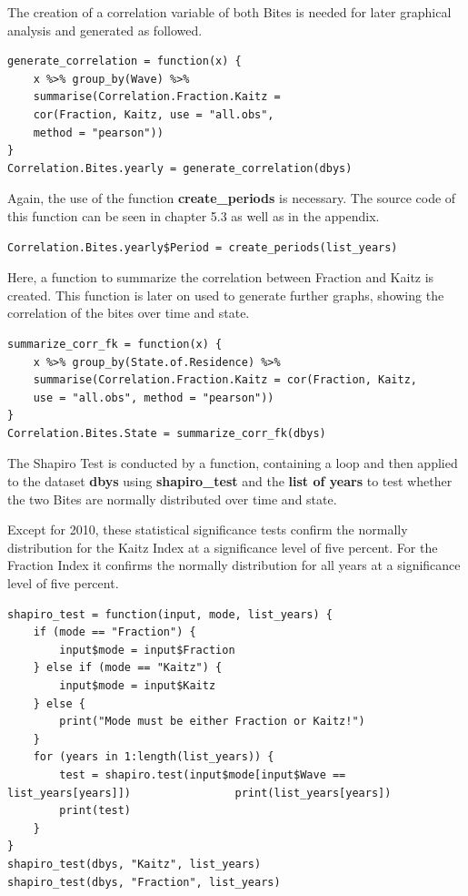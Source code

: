 \documentclass[a4paper]{article}
\begin{document}
{The creation of a correlation variable of both Bites is needed for later  graphical analysis and generated as followed.  
\begin{lstlisting}
generate_correlation = function(x) {
    x %>% group_by(Wave) %>% 
    summarise(Correlation.Fraction.Kaitz = 
    cor(Fraction, Kaitz, use = "all.obs", 
    method = "pearson"))
}
Correlation.Bites.yearly = generate_correlation(dbys)
\end{lstlisting}

Again, the use of the function \textbf{create\_periods} is necessary. The source code of this function can be seen in chapter 5.3 as well as in the appendix.
\begin{lstlisting}
Correlation.Bites.yearly$Period = create_periods(list_years)
\end{lstlisting}

Here, a function to summarize the correlation between Fraction and Kaitz is created. This function is later on used to generate further graphs, showing the correlation of the bites over time and state. 
\begin{lstlisting}
summarize_corr_fk = function(x) {
    x %>% group_by(State.of.Residence) %>% 
    summarise(Correlation.Fraction.Kaitz = cor(Fraction, Kaitz, 
    use = "all.obs", method = "pearson"))
}
Correlation.Bites.State = summarize_corr_fk(dbys)
\end{lstlisting}

The Shapiro Test is conducted by a function, containing a loop and then applied to the dataset \textbf{dbys} using \textbf{shapiro\_test} and the \textbf{list of years} to test whether the two Bites are normally distributed over time and state. 

Except for 2010, these statistical significance tests confirm the normally distribution for the Kaitz Index at a significance level of five percent. For the Fraction Index it confirms the normally distribution for all years at a significance level of five percent. 
\begin{lstlisting}
shapiro_test = function(input, mode, list_years) {
    if (mode == "Fraction") {
        input$mode = input$Fraction
    } else if (mode == "Kaitz") {
        input$mode = input$Kaitz
    } else {
        print("Mode must be either Fraction or Kaitz!")
    }
    for (years in 1:length(list_years)) {
        test = shapiro.test(input$mode[input$Wave == list_years[years]])       			print(list_years[years])
        print(test)
    }
}
shapiro_test(dbys, "Kaitz", list_years)
shapiro_test(dbys, "Fraction", list_years)
\end{lstlisting}

}
\end{document}
